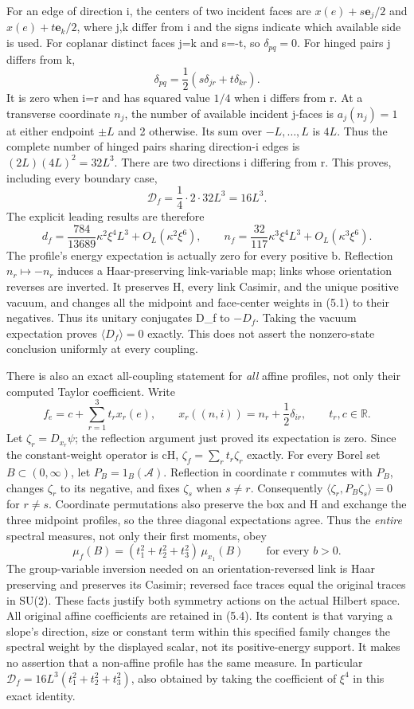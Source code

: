 \documentclass[
  11pt,
]{article}
\begin{document}
For an edge of direction i, the centers of two incident faces are
\(x(e)+s\mathbf e_j/2\) and \(x(e)+t\mathbf e_k/2\), where j,k differ
from i and the signs indicate which available side is used. For coplanar
distinct faces j=k and s=-t, so \(\delta_{pq}=0\). For hinged pairs j
differs from k, \[
 \delta_{pq}=\frac12(s\delta_{jr}+t\delta_{kr}).
\] It is zero when i=r and has squared value \(1/4\) when i differs from
r. At a transverse coordinate \(n_j\), the number of available incident
j-faces is \(a_j(n_j)=1\) at either endpoint \(\pm L\) and 2 otherwise.
Its sum over \(-L,\ldots,L\) is \(4L\). Thus the complete number of
hinged pairs sharing direction-i edges is \((2L)(4L)^2=32L^3\). There
are two directions i differing from r. This proves, including every
boundary case, \[
 \mathcal D_f=\frac14\cdot2\cdot32L^3=16L^3.
\tag{5.2}
\] The explicit leading results are therefore \[
 d_f=\frac{784}{13689}\kappa^2\xi^4L^3
                         +O_L(\kappa^2\xi^6),\qquad
 n_f=\frac{32}{117}\kappa^3\xi^4L^3
                         +O_L(\kappa^3\xi^6).
\tag{5.3}
\] The profile's energy expectation is actually zero for every positive
b. Reflection \(n_r\mapsto-n_r\) induces a Haar-preserving link-variable
map; links whose orientation reverses are inverted. It preserves H,
every link Casimir, and the unique positive vacuum, and changes all the
midpoint and face-center weights in (5.1) to their negatives. Thus its
unitary conjugates D\_f to \(-D_f\). Taking the vacuum expectation
proves \(\langle D_f\rangle=0\) exactly. This does not assert the
nonzero-state conclusion uniformly at every coupling.

There is also an exact all-coupling statement for \emph{all} affine
profiles, not only their computed Taylor coefficient. Write \[
 f_e=c+\sum_{r=1}^3t_r x_r(e),\qquad
 x_r((n,i))=n_r+\frac12\delta_{ir},\qquad t_r,c\in\mathbb R.
\] Let \(\zeta_r=D_{x_r}\psi\); the reflection argument just proved its
expectation is zero. Since the constant-weight operator is cH,
\(\zeta_f=\sum_rt_r\zeta_r\) exactly. For every Borel set
\(B\subset(0,\infty)\), let \(P_B=1_B(\mathcal A)\). Reflection in
coordinate r commutes with \(P_B\), changes \(\zeta_r\) to its negative,
and fixes \(\zeta_s\) when \(s\ne r\). Consequently
\(\langle\zeta_r,P_B\zeta_s\rangle=0\) for \(r\ne s\). Coordinate
permutations also preserve the box and H and exchange the three midpoint
profiles, so the three diagonal expectations agree. Thus the
\emph{entire} spectral measures, not only their first moments, obey \[
 \boxed{\mu_f(B)=(t_1^2+t_2^2+t_3^2)\,\mu_{x_1}(B)}
 \qquad\text{for every }b>0.
\tag{5.4}
\] The group-variable inversion needed on an orientation-reversed link
is Haar preserving and preserves its Casimir; reversed face traces equal
the original traces in SU(2). These facts justify both symmetry actions
on the actual Hilbert space. All original affine coefficients are
retained in (5.4). Its content is that varying a slope's direction, size
or constant term within this specified family changes the spectral
weight by the displayed scalar, not its positive-energy support. It
makes no assertion that a non-affine profile has the same measure. In
particular \(\mathcal D_f=16L^3(t_1^2+t_2^2+t_3^2)\), also obtained by
taking the coefficient of \(\xi^4\) in this exact identity.
\end{document}
